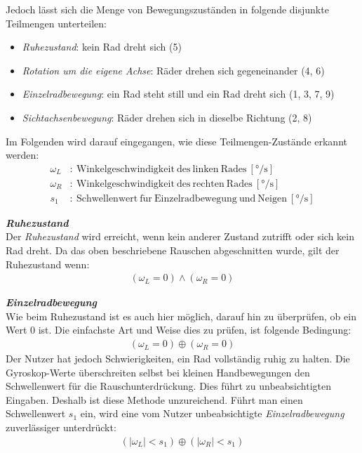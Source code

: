 

Jedoch lässt sich die Menge von Bewegungszuständen in folgende disjunkte Teilmengen unterteilen:
\begin{itemize}
    \item \textit{Ruhezustand}: kein Rad dreht sich (5)
    \item \textit{Rotation um die eigene Achse}: Räder drehen sich gegeneinander (4, 6)
    \item \textit{Einzelradbewegung}: ein Rad steht still und ein Rad dreht sich (1, 3, 7, 9)
    \item \textit{Sichtachsenbewegung}: Räder drehen sich in dieselbe Richtung (2, 8)
\end{itemize}

Im Folgenden wird darauf eingegangen, wie diese Teilmengen-Zustände erkannt werden:
\begin{align}
    \omega_L & :\ \mathrm{Winkelgeschwindigkeit\ des\ linken\ Rades}\ [\si{\degree/\second}]                 \\
    \omega_R & :\ \mathrm{Winkelgeschwindigkeit\ des\ rechten\ Rades}\ [\si{\degree/\second}]                \\
    s_1      & :\ \mathrm{Schwellenwert\ f\ddot{u}r\ Einzelradbewegung\ und\ Neigen}\ [\si{\degree/\second}]
\end{align}

\textbf{\textit{Ruhezustand}}\\
Der \textit{Ruhezustand} wird erreicht, wenn kein anderer Zustand zutrifft oder sich kein Rad dreht.
Da das oben beschriebene Rauschen abgeschnitten wurde, gilt der Ruhezustand wenn:
\begin{align}
    (\omega_L = 0) \land (\omega_R = 0)
\end{align}

\textbf{\textit{Einzelradbewegung}}\\
Wie beim Ruhezustand ist es auch hier möglich, darauf hin zu überprüfen, ob ein Wert 0 ist.
Die einfachste Art und Weise dies zu prüfen, ist folgende Bedingung:
\begin{align}
    (\omega_L = 0) \oplus (\omega_R = 0)
\end{align}
Der Nutzer hat jedoch Schwierigkeiten, ein Rad vollständig ruhig zu halten.
Die Gyroskop-Werte überschreiten selbst bei kleinen Handbewegungen den Schwellenwert für die Rauschunterdrückung.
Dies führt zu unbeabsichtigten Eingaben.
Deshalb ist diese Methode unzureichend.
Führt man einen Schwellenwert $s_1$ ein, wird eine vom Nutzer unbeabsichtigte \textit{Einzelradbewegung} zuverlässiger unterdrückt:
\begin{align}
    (|\omega_L| < s_1) \oplus (|\omega_R| < s_1)
\end{align}

